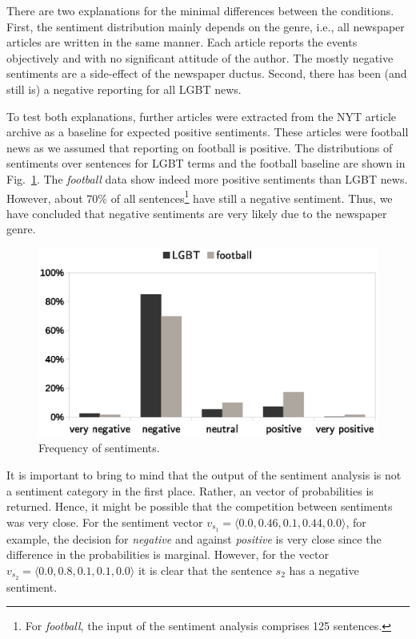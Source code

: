 \documentclass[10pt,a4paper,twocolumn]{scrartcl}
\begin{document}
There are two explanations for the minimal differences between the conditions. First, the sentiment distribution mainly depends on the genre, i.e., all newspaper articles are written in the same manner. Each article reports the events objectively and with no significant attitude of the author. The mostly negative sentiments are a side-effect of the newspaper ductus. Second, there has been (and still is) a negative reporting for all LGBT news.

To test both explanations, further articles were extracted from the NYT article archive as a baseline for expected positive sentiments. These articles were football news as we assumed that reporting on football is positive. The distributions of sentiments over sentences for LGBT terms and the football baseline are shown in Fig.~\ref{fig:sentiment1}. The \textit{football} data show indeed more positive sentiments than LGBT news. However, about 70\% of all sentences\footnote{For \textit{football}, the input of the sentiment analysis comprises 125 sentences.} have still a negative sentiment. Thus, we have concluded that negative sentiments are very likely due to the newspaper genre.

\begin{figure}
\includegraphics[width=\columnwidth]{figures/sentiment1}
\caption{Frequency of sentiments.}\label{fig:sentiment1}
\end{figure} 


It is important to bring to mind that the output of the sentiment analysis is not a sentiment category in the first place. Rather, an vector of probabilities is returned.  Hence, it might be possible that the competition between sentiments was very close. For the sentiment vector $v_{s_1} = \langle 0.0, 0.46, 0.1, 0.44, 0.0\rangle$, for example, the decision for \textit{negative} and against \textit{positive} is very close since the difference in the probabilities is marginal. However, for the vector $v_{s_2} = \langle 0.0, 0.8, 0.1, 0.1, 0.0\rangle$ it is clear that the sentence $s_2$ has a negative sentiment.
\end{document}
